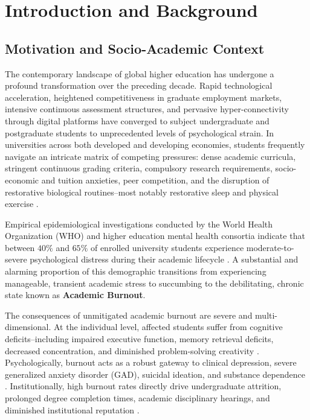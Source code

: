 \documentclass[12pt,a4paper,oneside]{report}
\begin{document}
\clearpage

\setcounter{page}{1}


\chapter{Introduction and Background}
\label{ch:introduction}

\section{Motivation and Socio-Academic Context}
\label{sec:motivation}
The contemporary landscape of global higher education has undergone a profound transformation over the preceding decade. Rapid technological acceleration, heightened competitiveness in graduate employment markets, intensive continuous assessment structures, and pervasive hyper-connectivity through digital platforms have converged to subject undergraduate and postgraduate students to unprecedented levels of psychological strain. In universities across both developed and developing economies, students frequently navigate an intricate matrix of competing pressures: dense academic curricula, stringent continuous grading criteria, compulsory research requirements, socio-economic and tuition anxieties, peer competition, and the disruption of restorative biological routines--most notably restorative sleep and physical exercise \cite{bano2022, schaufeli2002}.

Empirical epidemiological investigations conducted by the World Health Organization (WHO) and higher education mental health consortia indicate that between $40\%$ and $65\%$ of enrolled university students experience moderate-to-severe psychological distress during their academic lifecycle \cite{who2022mental}. A substantial and alarming proportion of this demographic transitions from experiencing manageable, transient academic stress to succumbing to the debilitating, chronic state known as \textbf{Academic Burnout}. 

The consequences of unmitigated academic burnout are severe and multi-dimensional. At the individual level, affected students suffer from cognitive deficits--including impaired executive function, memory retrieval deficits, decreased concentration, and diminished problem-solving creativity \cite{maslach2001}. Psychologically, burnout acts as a robust gateway to clinical depression, severe generalized anxiety disorder (GAD), suicidal ideation, and substance dependence \cite{dumas2020}. Institutionally, high burnout rates directly drive undergraduate attrition, prolonged degree completion times, academic disciplinary hearings, and diminished institutional reputation \cite{madigan2021}. 
\end{document}
